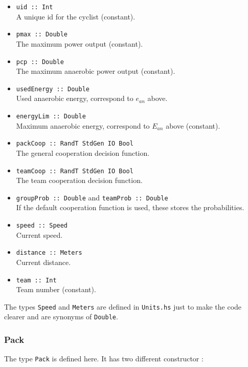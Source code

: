 \documentclass[10pt, a4paper]{report}
\begin{document}
\begin{itemize}
\item \texttt{uid :: Int} \\ A unique id for the cyclist (constant).
\item \texttt{pmax :: Double} \\ The maximum power output (constant).
\item \texttt{pcp :: Double} \\ The maximum anaerobic power output (constant).
\item \texttt{usedEnergy :: Double} \\ Used anaerobic energy, correspond to $e_{an}$ above.
\item \texttt{energyLim :: Double} \\ Maximum anaerobic energy, correspond to $E_{an}$ above (constant).
\item \texttt{packCoop :: RandT StdGen IO Bool} \\ The general cooperation decision function.
\item \texttt{teamCoop :: RandT StdGen IO Bool} \\ The team cooperation decision function.
\item \texttt{groupProb :: Double} and \texttt{teamProb :: Double} \\ If the default cooperation function is used, these stores the probabilities.
\item \texttt{speed :: Speed} \\ Current speed.
\item \texttt{distance :: Meters} \\ Current distance.
\item \texttt{team :: Int} \\ Team number (constant).
\end{itemize}
The types \texttt{Speed} and \texttt{Meters} are defined in \texttt{Units.hs} just to make the code clearer and are synonyms of \texttt{Double}.

\subsubsection{Pack}
The type \texttt{Pack} is defined here. It has two different constructor :
\end{document}
